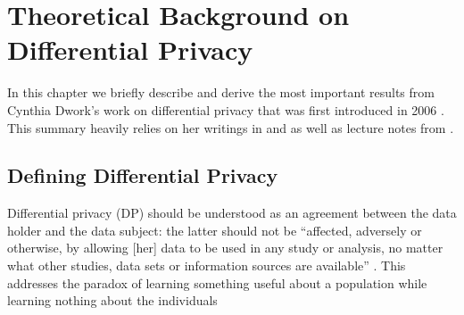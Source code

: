 \section{Theoretical Background on Differential Privacy}\label{ch2}

In this chapter we briefly describe and derive the most important results from Cynthia Dwork's work on differential privacy that was first introduced in 2006 \parencite{dwork2006differential}. This summary heavily relies on her writings in \parencite{dwork2019differential} and \parencite{dwork2014algorithmic} as well as lecture notes from \parencite{lecture_CSE711}.

\subsection{Defining Differential Privacy}
Differential privacy (DP) should be understood as an agreement between the data holder and the data subject: the latter should not be ``affected, adversely or otherwise, by allowing [her] data to be used in any study or analysis, no matter what other studies, data sets or information sources are available'' \parencite{dwork2014algorithmic}. This addresses the paradox of learning something useful about a population while learning nothing about the individuals



